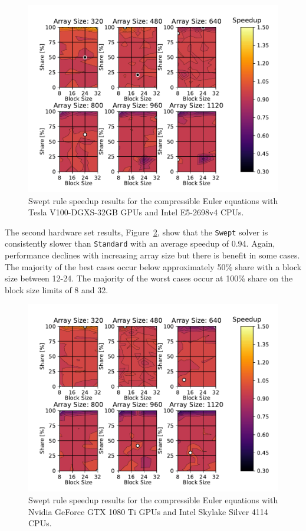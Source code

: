 \documentclass[review]{elsarticle}
\def\oldCPU{s}
\def\oldGPU{s}
\def\newCPU{s}
\def\newGPU{s}
\def\Swept{\texttt{Swept}}
\def\Standard{\texttt{Standard}}
\def\oldCPU{Intel Skylake Silver 4114} %
\def\oldGPU{Nvidia GeForce GTX 1080 Ti}
\def\newCPU{Intel E5-2698v4} %
\def\newGPU{Tesla V100-DGXS-32GB}
\begin{document}
\begin{figure}[htb!]
    \centering
    \includegraphics[scale=0.7]{figs/speedUpeulerNew.pdf}
    \caption{Swept rule speedup results  for the compressible Euler equations with \newGPU{} GPUs and \newCPU{} CPUs.}
    \label{fig:newSpeedupEuler}
\end{figure}

The second hardware set results, Figure~\ref{fig:oldSpeedupEuler}, show that the \Swept{} solver is consistently slower than \Standard{} with an average speedup of 0.94. Again, performance declines with increasing array size but there is benefit in some cases. The majority of the best cases occur below approximately 50\% share with a block size between 12-24. The majority of the worst cases occur at 100\% share on the block size limits of 8 and 32.

\begin{figure}[htb!]
    \centering
    \includegraphics[scale=0.7]{figs/speedUpeulerOld.pdf}
    \caption{Swept rule speedup results  for the compressible Euler equations with \oldGPU{} GPUs and \oldCPU{} CPUs.}
    \label{fig:oldSpeedupEuler}
\end{figure}
\end{document}

